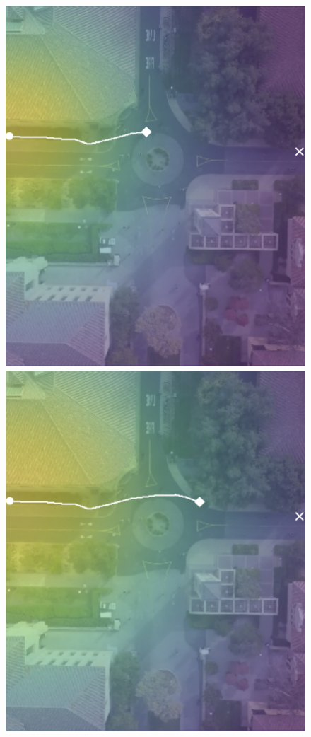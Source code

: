 \documentclass[letterpaper,10pt,conference]{ieeeconf}
\begin{document}
\begin{figure}
\begin{minipage}[t]{0.3\linewidth}
		\includegraphics[width=\linewidth]{./figures/comparison/rand_death_1_2_t=250.png}
	\end{minipage}
	\begin{minipage}[t]{0.3\linewidth}
		\includegraphics[width=\linewidth]{./figures/comparison/rand_death_1_2_t=370.png}
	\end{minipage}
	

\end{figure}
\end{document}
